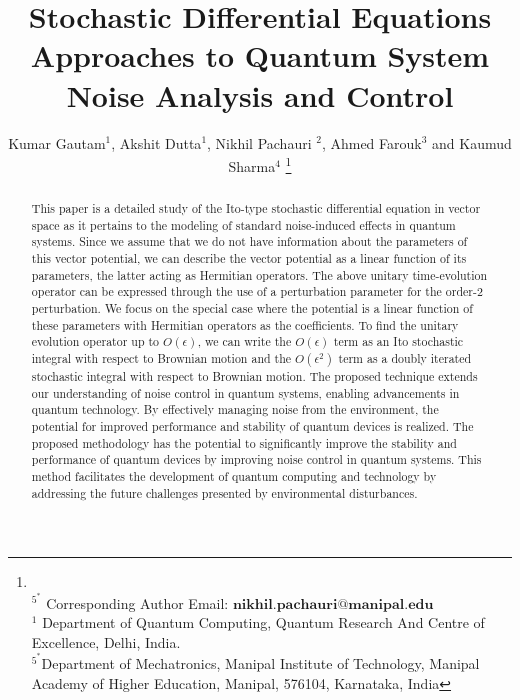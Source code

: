 \documentclass[journal,twocolumn]{IEEEtran}
\begin{document}
\title{Stochastic Differential Equations Approaches to Quantum System Noise Analysis and Control}

\author{{Kumar Gautam$^{1}$, Akshit Dutta$^{1}$, Nikhil Pachauri $^{2}$, Ahmed Farouk$^{3}$ and Kaumud Sharma$^{4}$} 
 \thanks{\\$^{5^*}$ Corresponding Author Email: $\boldsymbol{nikhil.pachauri@manipal.edu}$ \\$^{1}$ Department of Quantum Computing, Quantum Research And Centre of Excellence, Delhi, India.\\$^{5^*}$Department of Mechatronics, Manipal Institute of Technology, Manipal Academy of Higher Education, Manipal, 576104, Karnataka, India}}%



\maketitle

\begin{abstract}



This paper is a detailed study of the Ito-type stochastic differential equation in vector space as it pertains to the modeling of standard noise-induced effects in quantum systems. Since we assume that we do not have information about the parameters of this vector potential, we can describe the vector potential as a linear function of its parameters, the latter acting as Hermitian operators. The above unitary time-evolution operator can be expressed through the use of a perturbation parameter for the order-2 perturbation.
We focus on the special case where the potential is a linear function of these parameters with Hermitian operators as the coefficients. To find the unitary evolution operator up to $O(\epsilon)$, we can write the $O(\epsilon)$ term as an Ito stochastic integral with respect to Brownian motion and the $O(\epsilon^2)$ term as a doubly iterated stochastic integral with respect to Brownian motion. The proposed technique extends our understanding of noise control in quantum systems, enabling advancements in quantum technology. By effectively managing noise from the environment, the potential for improved performance and stability of quantum devices is realized. The proposed methodology has the potential to significantly improve the stability and performance of quantum devices by improving noise control in quantum systems. This method facilitates the development of quantum computing and technology by addressing the future challenges presented by environmental disturbances.

\end{abstract}
\end{document}
